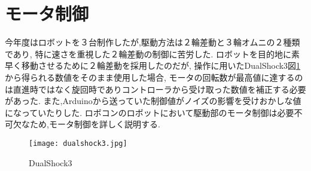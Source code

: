 \documentclass[12pt,oneside]{paper}
\begin{document}
\section{モータ制御}
今年度はロボットを３台制作したが,駆動方法は２輪差動と３輪オムニの２種類であり,
特に速さを重視した２輪差動の制御に苦労した.
ロボットを目的地に素早く移動させるために２輪差動を採用したのだが,
操作に用いたDualShock3図\ref{fig:ds3}から得られる数値をそのまま使用した場合,
モータの回転数が最高値に達するのは直進時ではなく旋回時でありコントローラから受け取った数値を補正する必要があった.
また,Arduinoから送っていた制御値がノイズの影響を受けおかしな値になっていたりした.
ロボコンのロボットにおいて駆動部のモータ制御は必要不可欠なため,モータ制御を詳しく説明する.
\begin{figure}[H]
 \begin{center}
  \texttt{[image: dualshock3.jpg]}
 \end{center}
 \caption{DualShock3}
 \label{fig:ds3}
\end{figure}
\end{document}
